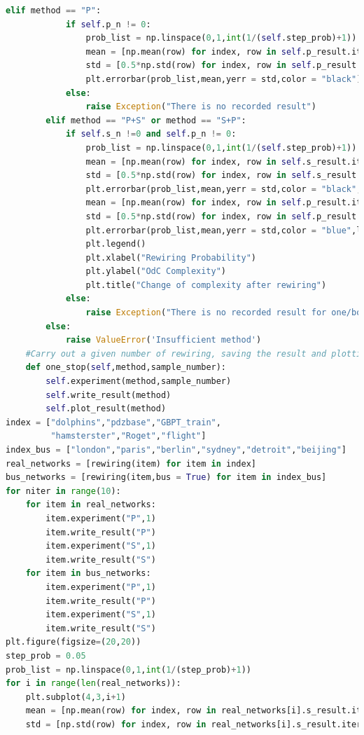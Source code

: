 \documentclass[12pt]{article}
\begin{document}
\begin{lstlisting}[breaklines=true,language=Python]
        elif method == "P":
            if self.p_n != 0:
                prob_list = np.linspace(0,1,int(1/(self.step_prob)+1))
                mean = [np.mean(row) for index, row in self.p_result.iterrows()]
                std = [0.5*np.std(row) for index, row in self.p_result.iterrows()]
                plt.errorbar(prob_list,mean,yerr = std,color = "black")
            else:
                raise Exception("There is no recorded result")
        elif method == "P+S" or method == "S+P":
            if self.s_n !=0 and self.p_n != 0:
                prob_list = np.linspace(0,1,int(1/(self.step_prob)+1))
                mean = [np.mean(row) for index, row in self.s_result.iterrows()]
                std = [0.5*np.std(row) for index, row in self.s_result.iterrows()]
                plt.errorbar(prob_list,mean,yerr = std,color = "black",label = "Single link rewiring")
                mean = [np.mean(row) for index, row in self.p_result.iterrows()]
                std = [0.5*np.std(row) for index, row in self.p_result.iterrows()]
                plt.errorbar(prob_list,mean,yerr = std,color = "blue",label = "Pairwise rewiring")
                plt.legend()
                plt.xlabel("Rewiring Probability")
                plt.ylabel("OdC Complexity")
                plt.title("Change of complexity after rewiring")
            else:
                raise Exception("There is no recorded result for one/both of the methods.")
        else:
            raise ValueError('Insufficient method')
    #Carry out a given number of rewiring, saving the result and plotting at the same time.
    def one_stop(self,method,sample_number):
        self.experiment(method,sample_number)
        self.write_result(method)
        self.plot_result(method)
index = ["dolphins","pdzbase","GBPT_train",
         "hamsterster","Roget","flight"]
index_bus = ["london","paris","berlin","sydney","detroit","beijing"]
real_networks = [rewiring(item) for item in index]
bus_networks = [rewiring(item,bus = True) for item in index_bus]
for niter in range(10):
    for item in real_networks:
        item.experiment("P",1)
        item.write_result("P")
        item.experiment("S",1)
        item.write_result("S")
    for item in bus_networks:
        item.experiment("P",1)
        item.write_result("P")
        item.experiment("S",1)
        item.write_result("S")
plt.figure(figsize=(20,20))
step_prob = 0.05
prob_list = np.linspace(0,1,int(1/(step_prob)+1))
for i in range(len(real_networks)):
    plt.subplot(4,3,i+1)
    mean = [np.mean(row) for index, row in real_networks[i].s_result.iterrows()]
    std = [np.std(row) for index, row in real_networks[i].s_result.iterrows()]

\end{lstlisting}
\end{document}
